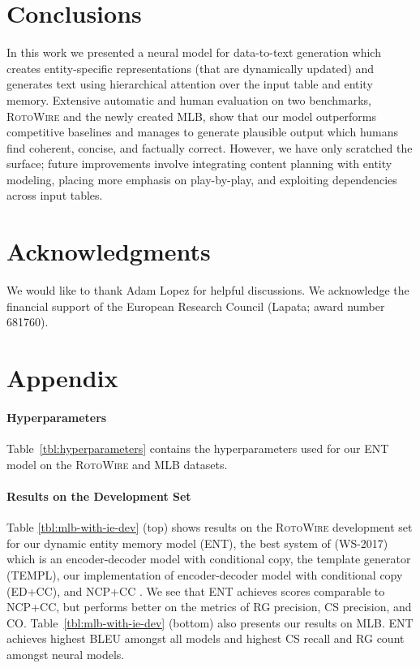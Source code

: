 \documentclass[11pt,a4paper]{article}
\begin{document}
\section{Conclusions}

In this work we presented a neural model for data-to-text generation
which creates entity-specific representations (that are dynamically
updated) and generates text using hierarchical attention over the
input table and entity memory. Extensive automatic and human
evaluation on two benchmarks, \textsc{RotoWire} and the newly created
MLB, show that our model outperforms competitive baselines and manages
to generate plausible output which humans find coherent, concise, and
factually correct. However, we have only scratched the surface; future
improvements involve integrating content planning with entity
modeling, placing more emphasis on play-by-play, and exploiting
dependencies across input tables.

\section*{Acknowledgments}
We would like to thank Adam Lopez for helpful discussions.
We acknowledge the financial support of the European Research Council 
(Lapata; award number 681760).




\appendix

\section{Appendix}
\label{sec:appendix}
\paragraph{Hyperparameters}
Table~\ref{tbl:hyperparameters} contains the hyperparameters used for
our ENT model on the \textsc{RotoWire} and MLB datasets.


\paragraph{Results on the Development Set}
Table \ref{tbl:mlb-with-ie-dev} (top) shows results on the
\textsc{RotoWire} development set for our dynamic
entity memory model (ENT), the best system of 
(WS-2017) which is an encoder-decoder model with conditional copy, the
template generator (TEMPL), our implementation of encoder-decoder
model with conditional copy (ED+CC), and NCP+CC
\cite{DBLP:journals/corr/abs-1809-00582}.
We see that ENT achieves scores comparable to NCP+CC, but performs
better on the metrics of RG precision, CS precision, and CO.
Table~\ref{tbl:mlb-with-ie-dev} (bottom) also presents our results on
MLB.  ENT achieves highest BLEU amongst all models and highest CS
recall and RG count amongst neural models.
\end{document}
